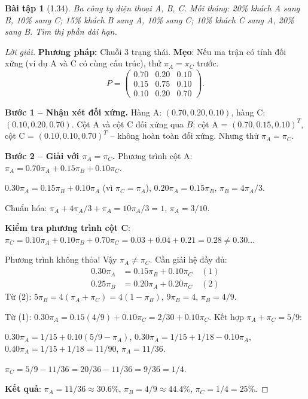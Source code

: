 \documentclass[8pt,a4paper]{article}
\newtheorem{exercise}{Bài tập}
\newenvironment{solution}{\begin{proof}[Lời giải]}{\end{proof}}
\begin{document}
\begin{exercise}[1.34]
Ba công ty điện thoại A, B, C. Mỗi tháng: 20\% khách A sang B, 10\% sang C; 15\% khách B sang A, 10\% sang C; 10\% khách C sang A, 20\% sang B. Tìm thị phần dài hạn.
\end{exercise}
\begin{solution}
\textbf{Phương pháp:} Chuỗi 3 trạng thái. \textbf{Mẹo}: Nếu ma trận có tính đối xứng (ví dụ A và C có cùng cấu trúc), thử $\pi_A = \pi_C$ trước.
\[
  P = \begin{pmatrix} 0.70 & 0.20 & 0.10 \\ 0.15 & 0.75 & 0.10 \\ 0.10 & 0.20 & 0.70 \end{pmatrix}.
\]

\textbf{Bước 1 -- Nhận xét đối xứng.}
Hàng A: $(0.70, 0.20, 0.10)$, hàng C: $(0.10, 0.20, 0.70)$. Cột A và cột C đối xứng qua $B$: cột A = $(0.70, 0.15, 0.10)^T$, cột C = $(0.10, 0.10, 0.70)^T$ -- không hoàn toàn đối xứng. Nhưng thử $\pi_A = \pi_C$.

\textbf{Bước 2 -- Giải với $\pi_A = \pi_C$.}
Phương trình cột A: $\pi_A = 0.70\pi_A + 0.15\pi_B + 0.10\pi_C$.

$0.30\pi_A = 0.15\pi_B + 0.10\pi_A$ (vì $\pi_C = \pi_A$), $0.20\pi_A = 0.15\pi_B$, $\pi_B = 4\pi_A/3$.

Chuẩn hóa: $\pi_A + 4\pi_A/3 + \pi_A = 10\pi_A/3 = 1$, $\pi_A = 3/10$.

\textbf{Kiểm tra phương trình cột C}: $\pi_C = 0.10\pi_A + 0.10\pi_B + 0.70\pi_C = 0.03 + 0.04 + 0.21 = 0.28 \neq 0.30$...

Phương trình không thỏa! Vậy $\pi_A \neq \pi_C$. Cần giải hệ đầy đủ:
\begin{align*}
  0.30\pi_A &= 0.15\pi_B + 0.10\pi_C \quad (1) \\
  0.25\pi_B &= 0.20\pi_A + 0.20\pi_C \quad (2)
\end{align*}
Từ (2): $5\pi_B = 4(\pi_A + \pi_C) = 4(1-\pi_B)$, $9\pi_B = 4$, $\pi_B = 4/9$.

Từ (1): $0.30\pi_A = 0.15(4/9) + 0.10\pi_C = 2/30 + 0.10\pi_C$. Kết hợp $\pi_A + \pi_C = 5/9$:

$0.30\pi_A = 1/15 + 0.10(5/9 - \pi_A)$, $0.30\pi_A = 1/15 + 1/18 - 0.10\pi_A$, $0.40\pi_A = 1/15 + 1/18 = 11/90$, $\pi_A = 11/36$.

$\pi_C = 5/9 - 11/36 = 20/36 - 11/36 = 9/36 = 1/4$.

\textbf{Kết quả}: $\pi_A = 11/36 \approx 30.6\%$, $\pi_B = 4/9 \approx 44.4\%$, $\pi_C = 1/4 = 25\%$.
\end{solution}
\end{document}
